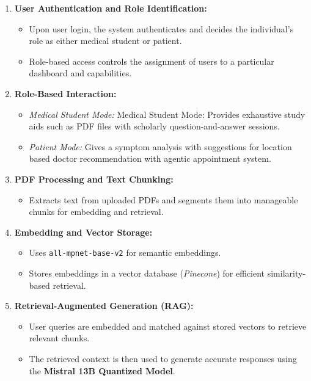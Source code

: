 \vspace{2cm}
\begin{enumerate}[itemsep=2em]
  \item \textbf{User Authentication and Role Identification:} 
    \begin{itemize}
        \item Upon user login, the system authenticates and decides the individual's role as either medical student or patient.
        \item Role-based access controls the assignment of users to a particular dashboard and capabilities.
    \end{itemize}
  \item \textbf{Role-Based Interaction:} 
    \begin{itemize}
        \item \emph{Medical Student Mode:} Medical Student Mode: Provides exhaustive study aids such as PDF files with scholarly question-and-answer sessions.
        \item \emph{Patient Mode:} Gives a symptom analysis with suggestions for location based doctor recommendation with agentic appointment system.
    \end{itemize}
  \item \textbf{PDF Processing and Text Chunking:} 
    \begin{itemize}
        \item Extracts text from uploaded PDFs and segments them into manageable chunks for embedding and retrieval.
    \end{itemize}
  \item \textbf{Embedding and Vector Storage:}
    \begin{itemize}
        \item Uses \texttt{all-mpnet-base-v2} for semantic embeddings.
        \item Stores embeddings in a vector database (\emph{Pinecone}) for efficient similarity-based retrieval.
    \end{itemize}
  \item \textbf{Retrieval-Augmented Generation (RAG):} 
    \begin{itemize}
        \item User queries are embedded and matched against stored vectors to retrieve relevant chunks.
        \item The retrieved context is then used to generate accurate responses using the \textbf{Mistral 13B Quantized Model}.
    \end{itemize}

\end{enumerate}

